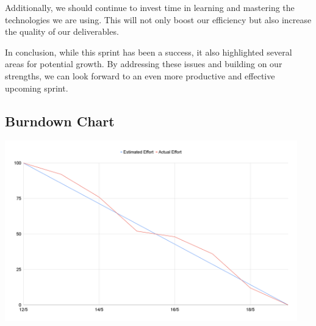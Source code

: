 \documentclass{article}
\begin{document}
Additionally, we should continue to invest time in learning and mastering the technologies we are using. This will not only boost our efficiency but also increase the quality of our deliverables.

In conclusion, while this sprint has been a success, it also highlighted several areas for potential growth. By addressing these issues and building on our strengths, we can look forward to an even more productive and effective upcoming sprint.

\subsection{Burndown Chart}
\includegraphics[width=0.95\textwidth]{images/burndown_chart.png}
\end{document}
